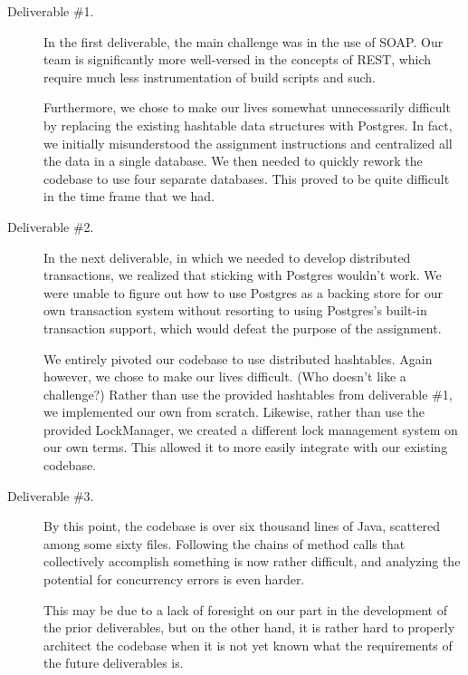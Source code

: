 \documentclass[letterpaper,11pt]{article}
\begin{document}
\begin{description}
    \item[Deliverable \#1.]
        In the first deliverable, the main challenge was in the use of SOAP.
        Our team is significantly more well-versed in the concepts of REST,
        which require much less instrumentation of build scripts and such.

        Furthermore, we chose to make our lives somewhat unnecessarily
        difficult by replacing the existing hashtable data structures with
        Postgres. In fact, we initially misunderstood the assignment
        instructions and centralized all the data in a single database. We then
        needed to quickly rework the codebase to use four separate databases.
        This proved to be quite difficult in the time frame that we had.

    \item[Deliverable \#2.]
        In the next deliverable, in which we needed to develop distributed
        transactions, we realized that sticking with Postgres wouldn't work.
        We were unable to figure out how to use Postgres as a backing store for
        our own transaction system without resorting to using Postgres's
        built-in transaction support, which would defeat the purpose of the
        assignment.

        We entirely pivoted our codebase to use distributed hashtables. Again
        however, we chose to make our lives difficult. (Who doesn't like a
        challenge?) Rather than use the provided hashtables from deliverable
        \#1, we implemented our own from scratch. Likewise, rather than use the
        provided LockManager, we created a different lock management system on
        our own terms. This allowed it to more easily integrate with our
        existing codebase.

    \item[Deliverable \#3.]
        By this point, the codebase is over six thousand lines of Java,
        scattered among some sixty files. Following the chains of method calls
        that collectively accomplish something is now rather difficult, and
        analyzing the potential for concurrency errors is even harder.

        This may be due to a lack of foresight on our part in the development
        of the prior deliverables, but on the other hand, it is rather hard to
        properly architect the codebase when it is not yet known what the
        requirements of the future deliverables is.
\end{description}
\end{document}
